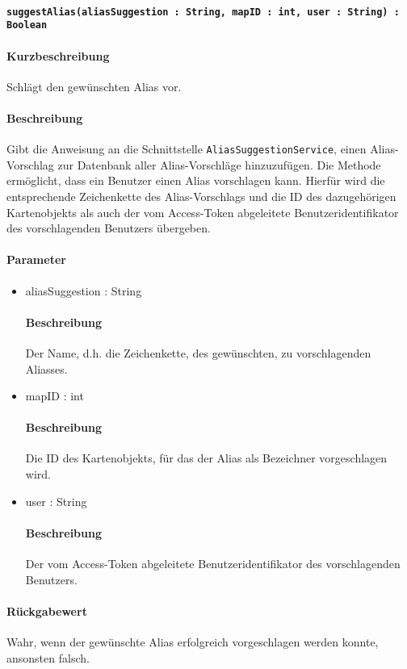 \paragraph*{\texttt{suggestAlias(aliasSuggestion : String, mapID : int, user : String) : Boolean}}%
\paragraph*{Kurzbeschreibung}
Schlägt den gewünschten Alias vor.
\paragraph*{Beschreibung}
Gibt die Anweisung an die Schnittstelle \texttt{AliasSuggestionService}, einen Alias-Vorschlag zur Datenbank aller Alias-Vorschläge hinzuzufügen.
Die Methode ermöglicht, dass ein Benutzer einen Alias vorschlagen kann. 
Hierfür wird die entsprechende Zeichenkette des Alias-Vorschlags und die ID des dazugehörigen Kartenobjekts als auch der vom Access-Token abgeleitete Benutzeridentifikator des vorschlagenden Benutzers übergeben.
\paragraph*{Parameter}
\begin{itemize}
	\item aliasSuggestion : String
		\paragraph*{Beschreibung}
		Der Name, d.h. die Zeichenkette, des gewünschten, zu vorschlagenden Aliasses.
	\item mapID : int
		\paragraph*{Beschreibung}
		Die ID des Kartenobjekts, für das der Alias als Bezeichner vorgeschlagen wird.
	\item user : String
		\paragraph*{Beschreibung}
		Der vom Access-Token abgeleitete Benutzeridentifikator des vorschlagenden Benutzers.
\end{itemize}
\paragraph*{Rückgabewert}
Wahr, wenn der gewünschte Alias erfolgreich vorgeschlagen werden konnte, ansonsten falsch.
